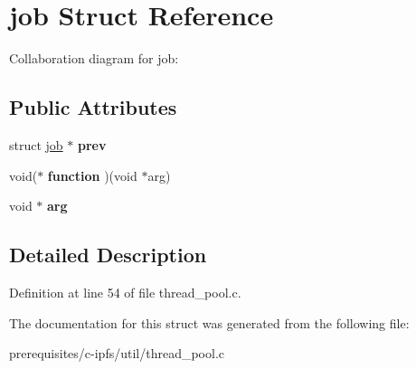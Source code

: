 \hypertarget{structjob}{}\section{job Struct Reference}
\label{structjob}


Collaboration diagram for job\+:
\subsection*{Public Attributes}
\begin{DoxyCompactItemize}
\item 
\mbox{\label{structjob_acf52ccdc0bae33438d7f78f7854452e6}} 
struct \mbox{\hyperlink{structjob}{job}} $\ast$ {\bfseries prev}
\item 
\mbox{\label{structjob_a5c88b9bfb4cfc67a89dadb496433ea3e}} 
void($\ast$ {\bfseries function} )(void $\ast$arg)
\item 
\mbox{\label{structjob_a82d571d2ffdc6c4115032dc54efb8552}} 
void $\ast$ {\bfseries arg}
\end{DoxyCompactItemize}


\subsection{Detailed Description}


Definition at line 54 of file thread\+\_\+pool.\+c.



The documentation for this struct was generated from the following file\+:\begin{DoxyCompactItemize}
\item 
prerequisites/c-\/ipfs/util/thread\+\_\+pool.\+c\end{DoxyCompactItemize}

